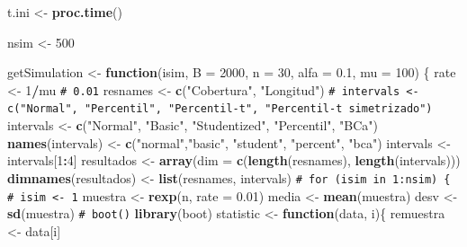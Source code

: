 \documentclass[
  spanish,
  10pt,
]{book}
\newenvironment{Shaded}{\begin{snugshade}}{\end{snugshade}}
\newcommand{\AttributeTok}[1]{\textcolor[rgb]{0.13,0.29,0.53}{#1}}
\newcommand{\CommentTok}[1]{\textcolor[rgb]{0.56,0.35,0.01}{\textit{#1}}}
\newcommand{\ControlFlowTok}[1]{\textcolor[rgb]{0.13,0.29,0.53}{\textbf{#1}}}
\newcommand{\DecValTok}[1]{\textcolor[rgb]{0.00,0.00,0.81}{#1}}
\newcommand{\FloatTok}[1]{\textcolor[rgb]{0.00,0.00,0.81}{#1}}
\newcommand{\FunctionTok}[1]{\textcolor[rgb]{0.13,0.29,0.53}{\textbf{#1}}}
\newcommand{\NormalTok}[1]{#1}
\newcommand{\OtherTok}[1]{\textcolor[rgb]{0.56,0.35,0.01}{#1}}
\newcommand{\SpecialCharTok}[1]{\textcolor[rgb]{0.81,0.36,0.00}{\textbf{#1}}}
\newcommand{\StringTok}[1]{\textcolor[rgb]{0.31,0.60,0.02}{#1}}
\theoremstyle{break}
\theoremstyle{nonumberplain}
\renewcommand{\CommentTok}[1]{\textcolor[rgb]{0.41,0.41,0.41}{\texttt{#1}}}
\begin{document}
\begin{Shaded}
\begin{Highlighting}[]
\NormalTok{t.ini }\OtherTok{\textless{}{-}} \FunctionTok{proc.time}\NormalTok{()}

\NormalTok{nsim }\OtherTok{\textless{}{-}} \DecValTok{500}

\NormalTok{getSimulation }\OtherTok{\textless{}{-}} \ControlFlowTok{function}\NormalTok{(isim, }\AttributeTok{B =} \DecValTok{2000}\NormalTok{, }\AttributeTok{n =} \DecValTok{30}\NormalTok{, }\AttributeTok{alfa =} \FloatTok{0.1}\NormalTok{, }\AttributeTok{mu =} \DecValTok{100}\NormalTok{) \{}
\NormalTok{    rate }\OtherTok{\textless{}{-}} \DecValTok{1}\SpecialCharTok{/}\NormalTok{mu }\CommentTok{\# 0.01}
\NormalTok{    resnames }\OtherTok{\textless{}{-}} \FunctionTok{c}\NormalTok{(}\StringTok{"Cobertura"}\NormalTok{, }\StringTok{"Longitud"}\NormalTok{)}
    \CommentTok{\# intervals \textless{}{-} c("Normal", "Percentil", "Percentil{-}t", "Percentil{-}t simetrizado")}
\NormalTok{    intervals }\OtherTok{\textless{}{-}} \FunctionTok{c}\NormalTok{(}\StringTok{"Normal"}\NormalTok{, }\StringTok{"Basic"}\NormalTok{, }\StringTok{"Studentized"}\NormalTok{, }\StringTok{"Percentil"}\NormalTok{, }\StringTok{"BCa"}\NormalTok{)}
    \FunctionTok{names}\NormalTok{(intervals) }\OtherTok{\textless{}{-}} \FunctionTok{c}\NormalTok{(}\StringTok{"normal"}\NormalTok{,}\StringTok{"basic"}\NormalTok{, }\StringTok{"student"}\NormalTok{, }\StringTok{"percent"}\NormalTok{, }\StringTok{"bca"}\NormalTok{)}
\NormalTok{    intervals }\OtherTok{\textless{}{-}}\NormalTok{ intervals[}\DecValTok{1}\SpecialCharTok{:}\DecValTok{4}\NormalTok{]}
\NormalTok{    resultados }\OtherTok{\textless{}{-}} \FunctionTok{array}\NormalTok{(}\AttributeTok{dim =} \FunctionTok{c}\NormalTok{(}\FunctionTok{length}\NormalTok{(resnames), }\FunctionTok{length}\NormalTok{(intervals)))}
    \FunctionTok{dimnames}\NormalTok{(resultados) }\OtherTok{\textless{}{-}} \FunctionTok{list}\NormalTok{(resnames, intervals)}
    \CommentTok{\# for (isim in 1:nsim) \{ \# isim \textless{}{-} 1}
\NormalTok{    muestra }\OtherTok{\textless{}{-}} \FunctionTok{rexp}\NormalTok{(n, }\AttributeTok{rate =} \FloatTok{0.01}\NormalTok{)}
\NormalTok{    media }\OtherTok{\textless{}{-}} \FunctionTok{mean}\NormalTok{(muestra)}
\NormalTok{    desv }\OtherTok{\textless{}{-}} \FunctionTok{sd}\NormalTok{(muestra)}
    \CommentTok{\# boot()}
    \FunctionTok{library}\NormalTok{(boot)}
\NormalTok{    statistic }\OtherTok{\textless{}{-}} \ControlFlowTok{function}\NormalTok{(data, i)\{}
\NormalTok{      remuestra }\OtherTok{\textless{}{-}}\NormalTok{ data[i]}

\end{Highlighting}
\end{Shaded}
\end{document}
